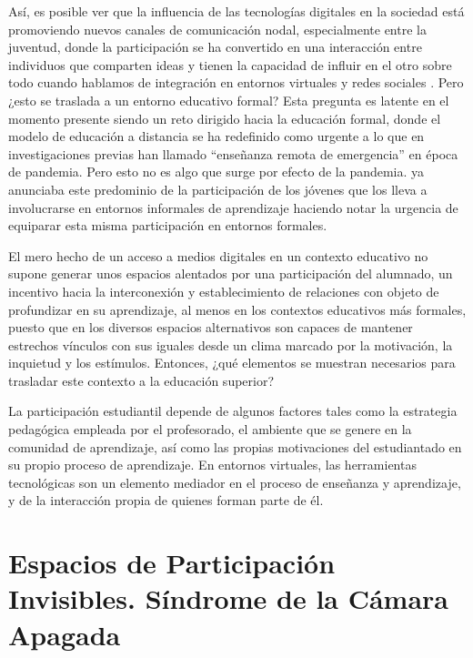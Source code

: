 \documentclass[spanish]{textolivre}
\begin{document}
Así, es posible ver que la influencia de las tecnologías digitales en la sociedad está promoviendo nuevos canales de comunicación nodal, especialmente entre la juventud, donde la participación se ha convertido en una interacción entre individuos que comparten ideas y tienen la capacidad de influir en el otro sobre todo cuando hablamos de integración en entornos virtuales y redes sociales \cite{torres-diaz_integracion_2013,gonzalez-lizarraga_cyberactivism:_2016,sabulsky_analiticas_2019,hernandez-selles_herramientas_2021}. Pero ¿esto se traslada a un entorno educativo formal? Esta pregunta es latente en el momento presente siendo un reto dirigido hacia la educación formal, donde el modelo de educación a distancia se ha redefinido como urgente a lo que en investigaciones previas \cite{charles_hodges_difference_2020,martinez_perez_educacion_2020,sangra_decalogo_2020,garcia_aretio_covid-19_2020} han llamado “enseñanza remota de emergencia” en época de pandemia. Pero esto no es algo que surge por efecto de la pandemia. \textcite{unesco_marco_2019} ya anunciaba este predominio de la participación de los jóvenes que los lleva a involucrarse en entornos informales de aprendizaje haciendo notar la urgencia de equiparar esta misma participación en entornos formales.

El mero hecho de un acceso a medios digitales en un contexto educativo no supone generar unos espacios alentados por una participación del alumnado, un incentivo hacia la interconexión y establecimiento de relaciones con objeto de profundizar en su aprendizaje, al menos en los contextos educativos más formales, puesto que en los diversos espacios alternativos son capaces de mantener estrechos vínculos con sus iguales desde un clima marcado por la motivación, la inquietud y los estímulos. Entonces, ¿qué elementos se muestran necesarios para trasladar este contexto a la educación superior?

La participación estudiantil depende de algunos factores tales como la estrategia pedagógica empleada por el profesorado, el ambiente que se genere en la comunidad de aprendizaje, así como las propias motivaciones del estudiantado en su propio proceso de aprendizaje. En entornos virtuales, las herramientas tecnológicas son un elemento mediador en el proceso de enseñanza y aprendizaje, y de la interacción propia de quienes forman parte de él.

\section{Espacios de Participación Invisibles. Síndrome de la Cámara Apagada}\label{sec-espacios}
\end{document}
